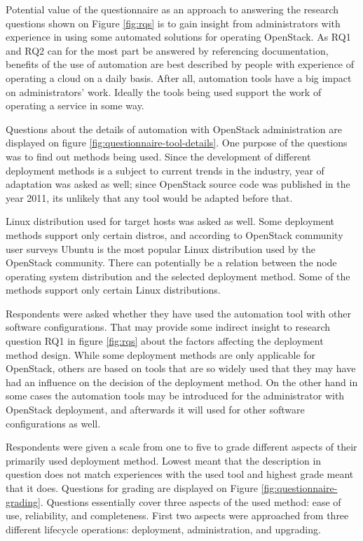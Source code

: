 Potential value of the questionnaire as an approach to answering the research
questions shown on Figure \ref{fig:rqs} is to gain insight from administrators
with experience in using some automated solutions for operating OpenStack. As
RQ1 and RQ2 can for the most part be answered by referencing documentation,
benefits of the use of automation are best described by people with experience
of operating a cloud on a daily basis. After all, automation tools have a big
impact on administrators' work. Ideally the tools being used support the work
of operating a service in some way.

Questions about the details of automation with OpenStack administration are
displayed on figure \ref{fig:questionnaire-tool-details}. One purpose of the
questions was to find out methods being used. Since the development of
different deployment methods is a subject to current trends in the industry,
year of adaptation was asked as well; since OpenStack source code was published
in the year 2011, its unlikely that any tool would be adapted before that.

Linux distribution used for target hosts was asked as well. Some deployment
methods support only certain distros, and according to OpenStack community user
surveys \cite{openstack-user-survey-2018} Ubuntu is the most popular Linux
distribution used by the OpenStack community. There can potentially be a
relation between the node operating system distribution and the selected
deployment method. Some of the methods support only certain Linux
distributions.

Respondents were asked whether they have used the automation tool with other
software configurations. That may provide some indirect insight to research
question RQ1 in figure \ref{fig:rqs} about the factors affecting the deployment
method design. While some deployment methods are only applicable for OpenStack,
others are based on tools that are so widely used that they may have had an
influence on the decision of the deployment method. On the other hand in some
cases the automation tools may be introduced for the administrator with
OpenStack deployment, and afterwards it will used for other software
configurations as well.

Respondents were given a scale from one to five to grade different aspects of
their primarily used deployment method. Lowest meant that the description in
question does not match experiences with the used tool and highest grade meant
that it does. Questions for grading are displayed on Figure
\ref{fig:questionnaire-grading}. Questions essentially cover three aspects of
the used method: ease of use, reliability, and completeness. First two aspects
were approached from three different lifecycle operations: deployment,
administration, and upgrading.

